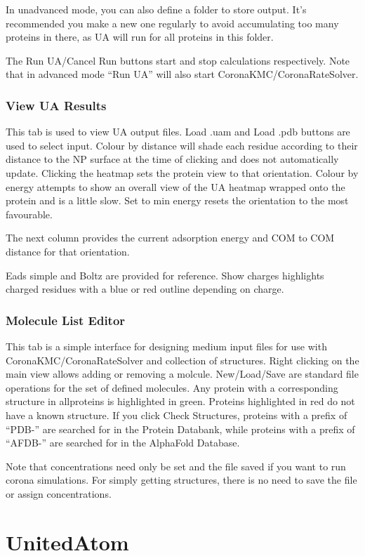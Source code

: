 \documentclass[10pt,a4paper,onecolumn]{report}
\begin{document}
In unadvanced mode, you can also define a folder to store output. It's recommended you make a new one regularly to avoid accumulating too many proteins in there, as UA will run for all proteins in this folder.

The Run UA/Cancel Run buttons start and stop calculations respectively. Note that in advanced mode ``Run UA'' will also start CoronaKMC/CoronaRateSolver.
\subsection{View UA Results}
This tab is used to view UA output files. Load .uam and Load .pdb buttons are used to select input. Colour by distance will shade each residue according to their distance to the NP surface at the time of clicking and does not automatically update. Clicking the heatmap sets the protein view to that orientation.
Colour by energy attempts to show an overall view of the UA heatmap wrapped onto the protein and is a little slow.
Set to min energy resets the orientation to the most favourable.

The next column provides the current adsorption energy and COM to COM distance for that orientation.

Eads simple and Boltz are provided for reference.
Show charges highlights charged residues with a blue or red outline depending on charge. 
\subsection{Molecule List Editor}
This tab is a simple interface for designing medium input files for use with CoronaKMC/CoronaRateSolver and collection of structures.
Right clicking on the main view allows adding or removing a molcule. New/Load/Save are standard file operations for the set of defined molecules.
Any protein with a corresponding structure in all\textunderscore proteins is highlighted in green. Proteins highlighted in red do not have a known structure.
If you click Check Structures, proteins with a prefix of ``PDB-'' are searched for in the Protein Databank, while proteins with a prefix of ``AFDB-'' are searched for in the AlphaFold Database.

Note that concentrations need only be set and the file saved if you want to run corona simulations. For simply getting structures, there is no need to save the file or assign concentrations. 

\chapter{UnitedAtom}
\end{document}
